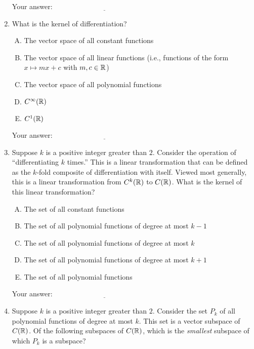 \documentclass[10pt]{amsart}
\begin{document}
\begin{enumerate}
  \vspace{0.1in}
  Your answer: $\underline{\qquad\qquad\qquad\qquad\qquad\qquad\qquad}$
  \vspace{0.1in}

\item What is the kernel of differentiation?

  \begin{enumerate}[(A)]
  \item The vector space of all constant functions
  \item The vector space of all linear functions (i.e., functions of
    the form $x \mapsto mx + c$ with $m,c \in \mathbb{R}$)
  \item The vector space of all polynomial functions
  \item $C^\infty(\mathbb{R})$
  \item $C^1(\mathbb{R})$
  \end{enumerate}

  \vspace{0.1in}
  Your answer: $\underline{\qquad\qquad\qquad\qquad\qquad\qquad\qquad}$
  \vspace{0.1in}

\item Suppose $k$ is a positive integer greater than $2$. Consider the
  operation of ``differentiating $k$ times.'' This is a linear
  transformation that can be defined as the $k$-fold composite of
  differentiation with itself. Viewed most generally, this is a linear
  transformation from $C^k(\mathbb{R})$ to $C(\mathbb{R})$. What is the kernel of this
  linear transformation?

  \begin{enumerate}[(A)]
  \item The set of all constant functions
  \item The set of all polynomial functions of degree at most $k - 1$
  \item The set of all polynomial functions of degree at most $k$
  \item The set of all polynomial functions of degree at most $k + 1$
  \item The set of all polynomial functions
  \end{enumerate}

  \vspace{0.1in}
  Your answer: $\underline{\qquad\qquad\qquad\qquad\qquad\qquad\qquad}$
  \vspace{0.1in}

\item Suppose $k$ is a positive integer greater than $2$. Consider the
  set $P_k$ of all polynomial functions of degree at most $k$. This
  set is a vector subspace of $C(\mathbb{R})$. Of the following subspaces of
  $C(\mathbb{R})$, which is the {\em smallest} subspace of which $P_k$ is a
  subspace?


\end{enumerate}
\end{document}
